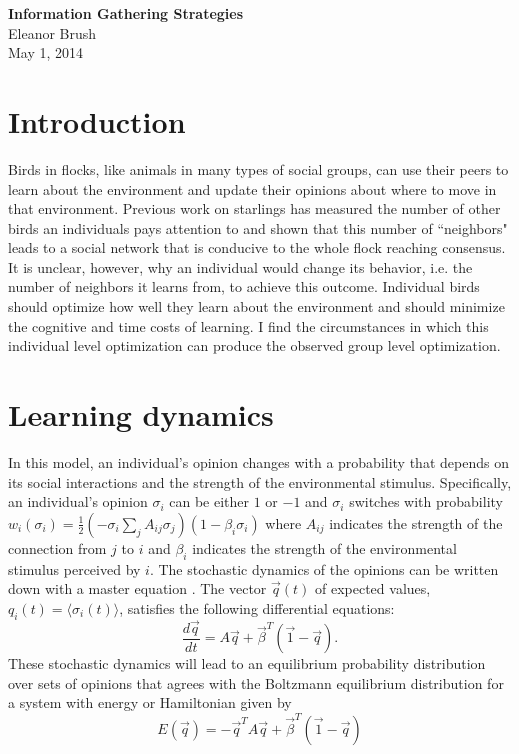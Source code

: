 \documentclass{article}
\begin{document}
\begin{center}
{\bf \LARGE{Information Gathering Strategies}}
\vspace{10pt}
\\ Eleanor Brush
\\ May 1, 2014
\end{center}

\tableofcontents

\section{Introduction}
Birds in flocks, like animals in many types of social groups, can use their peers to learn about the environment and update their opinions about where to move in that environment.  Previous work on starlings has measured the number of other birds an individuals pays attention to and shown that this number of ``neighbors" leads to a social network that is conducive to the whole flock reaching consensus.  It is unclear, however, why an individual would change its behavior, i.e. the number of neighbors it learns from, to achieve this outcome.  Individual birds should optimize how well they learn about the environment and should minimize the cognitive and time costs of learning.  I find the circumstances in which this individual level optimization can produce the observed group level optimization.

\section{Learning dynamics}
In this model, an individual's opinion changes with a probability that depends on its social interactions and the strength of the environmental stimulus. Specifically, an individual's opinion $\sigma_i$ can be either $1$ or $-1$ and $\sigma_i$ switches with probability $w_i(\sigma_i)=\frac{1}{2}(-\sigma_i\sum_jA_{ij}\sigma_j )(1-\beta_i\sigma_i)$ where $A_{ij}$ indicates the strength of the connection from $j$ to $i$ and $\beta_i$ indicates the strength of the environmental stimulus perceived by $i$.  The stochastic dynamics of the opinions can be written down with a master equation \cite{Glauber:1963fk}.  The vector $\vec{q}(t)$ of expected values, $q_i(t)=\langle \sigma_i(t)\rangle$, satisfies the following differential equations: \cite{Glauber:1963fk}
\begin{equation*}
\frac{d\vec{q}}{dt}=A\vec{q}+\vec{\beta}^T(\vec{1}-\vec{q}).
\end{equation*}
These stochastic dynamics will lead to an equilibrium probability distribution over sets of opinions that agrees with the Boltzmann equilibrium distribution for a system with energy or Hamiltonian given by 
\begin{equation*}
E(\vec{q})=-\vec{q}^TA\vec{q}+\vec{\beta}^T(\vec{1}-\vec{q})
\end{equation*}  
\end{document}
